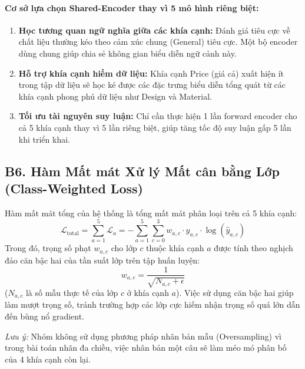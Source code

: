 \documentclass[11pt,a4paper]{article}
\begin{document}
\paragraph{Cơ sở lựa chọn Shared-Encoder thay vì 5 mô hình riêng biệt:}
\begin{enumerate}
    \item \textbf{Học tương quan ngữ nghĩa giữa các khía cạnh:} Đánh giá tiêu cực về chất liệu thường kéo theo cảm xúc chung (General) tiêu cực. Một bộ encoder dùng chung giúp chia sẻ không gian biểu diễn ngữ cảnh này.
    \item \textbf{Hỗ trợ khía cạnh hiếm dữ liệu:} Khía cạnh Price (giá cả) xuất hiện ít trong tập dữ liệu sẽ học ké được các đặc trưng biểu diễn tổng quát từ các khía cạnh phong phú dữ liệu như Design và Material.
    \item \textbf{Tối ưu tài nguyên suy luận:} Chỉ cần thực hiện 1 lần forward encoder cho cả 5 khía cạnh thay vì 5 lần riêng biệt, giúp tăng tốc độ suy luận gấp 5 lần khi triển khai.
\end{enumerate}

\subsection*{B6. Hàm Mất mát Xử lý Mất cân bằng Lớp (Class-Weighted Loss)}
Hàm mất mát tổng của hệ thống là tổng mất mát phân loại trên cả 5 khía cạnh:
\begin{equation}
    \mathcal{L}_{\text{total}} = \sum_{a=1}^5 \mathcal{L}_a = - \sum_{a=1}^5 \sum_{c=0}^3 w_{a,c} \cdot y_{a,c} \cdot \log(\hat{y}_{a,c})
\end{equation}
Trong đó, trọng số phạt $w_{a,c}$ cho lớp $c$ thuộc khía cạnh $a$ được tính theo nghịch đảo căn bậc hai của tần suất lớp trên tập huấn luyện:
\begin{equation}
    w_{a,c} = \frac{1}{\sqrt{N_{a,c} + \epsilon}}
\end{equation}
($N_{a,c}$ là số mẫu thực tế của lớp $c$ ở khía cạnh $a$). Việc sử dụng căn bậc hai giúp làm mượt trọng số, tránh trường hợp các lớp cực hiếm nhận trọng số quá lớn dẫn đến bùng nổ gradient. 

\textit{Lưu ý:} Nhóm không sử dụng phương pháp nhân bản mẫu (Oversampling) vì trong bài toán nhãn đa chiều, việc nhân bản một câu sẽ làm méo mó phân bố của 4 khía cạnh còn lại.
\end{document}
